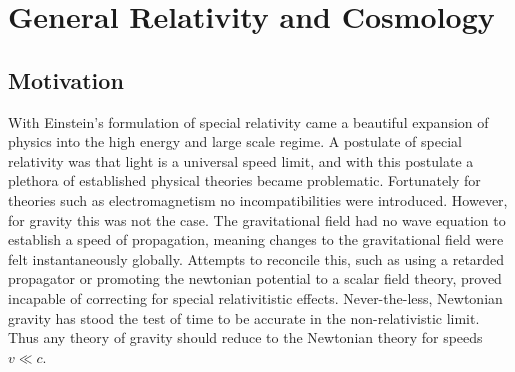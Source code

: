 \chapter{General Relativity and Cosmology}
\section{Motivation}
With Einstein's formulation of special relativity came a beautiful expansion of physics into the high energy and large scale regime. A postulate of special relativity was that light is a universal speed limit, and with this postulate a plethora of established physical theories became problematic. Fortunately for theories such as electromagnetism no incompatibilities were introduced. However, for gravity this was not the case. The gravitational field had no wave equation to establish a speed of propagation, meaning changes to the gravitational field were felt instantaneously globally. Attempts to reconcile this, such as using a retarded propagator or promoting the newtonian potential to a scalar field theory, proved incapable of correcting for special relativitistic effects. Never-the-less, Newtonian gravity has stood the test of time to be accurate in the non-relativistic limit. Thus any theory of gravity should reduce to the Newtonian theory for speeds $v \ll c$.

